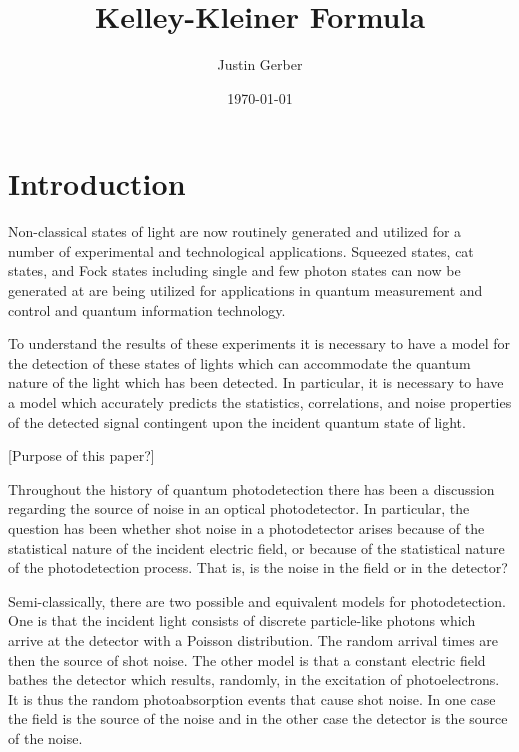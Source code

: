 \documentclass[12pt]{article}
\begin{document}
\title{Kelley-Kleiner Formula}
\author{Justin Gerber}
\date{\today}
\maketitle


\section*{Introduction}
Non-classical states of light are now routinely generated and utilized for a number of experimental and technological applications. Squeezed states, cat states, and Fock states including single and few photon states can now be generated at are being utilized for applications in quantum measurement and control and quantum information technology.

To understand the results of these experiments it is necessary to have a model for the detection of these states of lights which can accommodate the quantum  nature of the light which has been detected. In particular, it is necessary to have a model which accurately predicts the statistics, correlations, and noise properties of the detected signal contingent upon the incident quantum state of light.

[Purpose of this paper?]



Throughout the history of quantum photodetection there has been a discussion regarding the source of noise in an optical photodetector. In particular, the question has been whether shot noise in a photodetector arises because of the statistical nature of the incident electric field, or because of the statistical nature of the photodetection process. That is, is the noise in the field or in the detector?

Semi-classically, there are two possible and equivalent models for photodetection. One is that the incident light consists of discrete particle-like photons which arrive at the detector with a Poisson distribution. The random arrival times are then the source of shot noise. The other model is that a constant electric field bathes the detector which results, randomly, in the excitation of photoelectrons. It is thus the random photoabsorption events that cause shot noise. In one case the field is the source of the noise and in the other case the detector is the source of the noise.
\end{document}
